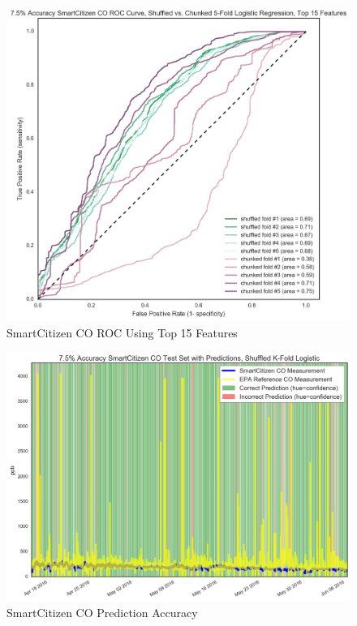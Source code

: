 \begin{figure}[htb]
 	\includegraphics[width=\textwidth]{figs/sck_co_7p5_roc_pruned_features}               
 	 \caption{SmartCitizen CO ROC Using Top 15 Features}
  	\label{fig:sck_co_7p5_roc_pruned_features}
\end{figure}

\begin{figure}[htb]
 	\includegraphics[width=\textwidth]{figs/sck_co_7p5_logistic_predictions}               
 	 \caption{SmartCitizen CO Prediction Accuracy}
  	\label{fig:sck_co_7p5_logistic_predictions}
\end{figure}



